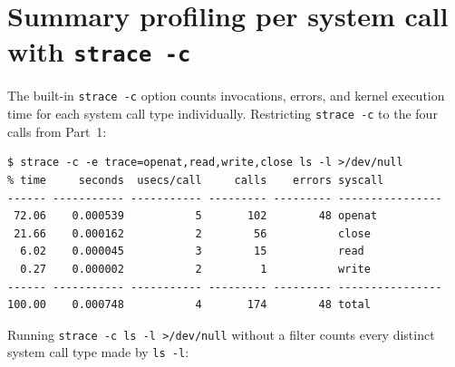 \documentclass{../latex/utmreport}
\begin{document}
\section{Summary profiling per system call with \texttt{strace -c}}

The built-in \texttt{strace -c} option counts invocations, errors, and kernel execution time for each system call type individually. Restricting \texttt{strace -c} to the four calls from Part~1:

\begin{lstlisting}
$ strace -c -e trace=openat,read,write,close ls -l >/dev/null
% time     seconds  usecs/call     calls    errors syscall
------ ----------- ----------- --------- --------- ----------------
 72.06    0.000539           5       102        48 openat
 21.66    0.000162           2        56           close
  6.02    0.000045           3        15           read
  0.27    0.000002           2         1           write
------ ----------- ----------- --------- --------- ----------------
100.00    0.000748           4       174        48 total
\end{lstlisting}

Running \texttt{strace -c ls -l >/dev/null} without a filter counts every distinct system call type made by \texttt{ls -l}:
\end{document}
